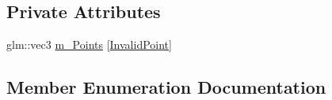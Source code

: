 \subsection*{Private Attributes}
\begin{DoxyCompactItemize}
\item 
glm\+::vec3 \hyperlink{class_face3_d_1_1_face_coordinates3d_aa4646a4766c4c5a8ce010ec05f49ffab}{m\+\_\+\+Points} \mbox{[}\hyperlink{class_face3_d_1_1_face_coordinates3d_a8bedd28eb0ab2749aa98a888921ea2b2a7a89277f3a276a2c9c008860d4e73e99}{Invalid\+Point}\mbox{]}
\end{DoxyCompactItemize}


\subsection{Member Enumeration Documentation}
